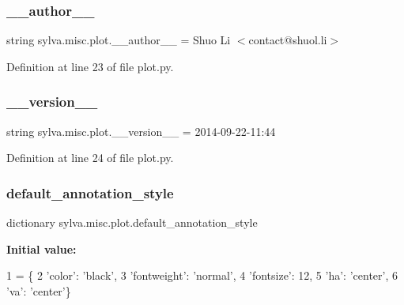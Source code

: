 \subsubsection{\texorpdfstring{\+\_\+\+\_\+author\+\_\+\+\_\+}{\_\_author\_\_}}
{\footnotesize\ttfamily string sylva.\+misc.\+plot.\+\_\+\+\_\+author\+\_\+\+\_\+ = \textquotesingle{}Shuo Li $<$contact@shuol.\+li$>$\textquotesingle{}\hspace{0.3cm}{\ttfamily [private]}}



Definition at line 23 of file plot.\+py.

\mbox{\label{namespacesylva_1_1misc_1_1plot_aeaebaa88de4546f2ce3ff8b7e568797e}} 
\subsubsection{\texorpdfstring{\+\_\+\+\_\+version\+\_\+\+\_\+}{\_\_version\_\_}}
{\footnotesize\ttfamily string sylva.\+misc.\+plot.\+\_\+\+\_\+version\+\_\+\+\_\+ = \textquotesingle{}2014-\/09-\/22-\/11\+:44\textquotesingle{}\hspace{0.3cm}{\ttfamily [private]}}



Definition at line 24 of file plot.\+py.

\mbox{\label{namespacesylva_1_1misc_1_1plot_affc8bfc885cfaf5e1995cf4fd8d084c6}} 
\subsubsection{\texorpdfstring{default\+\_\+annotation\+\_\+style}{default\_annotation\_style}}
{\footnotesize\ttfamily dictionary sylva.\+misc.\+plot.\+default\+\_\+annotation\+\_\+style}

{\bfseries Initial value\+:}
\begin{DoxyCode}
1 =  \{
2         \textcolor{stringliteral}{'color'}: \textcolor{stringliteral}{'black'},
3         \textcolor{stringliteral}{'fontweight'}: \textcolor{stringliteral}{'normal'},
4         \textcolor{stringliteral}{'fontsize'}: 12,
5         \textcolor{stringliteral}{'ha'}: \textcolor{stringliteral}{'center'},
6         \textcolor{stringliteral}{'va'}: \textcolor{stringliteral}{'center'}\}
\end{DoxyCode}


